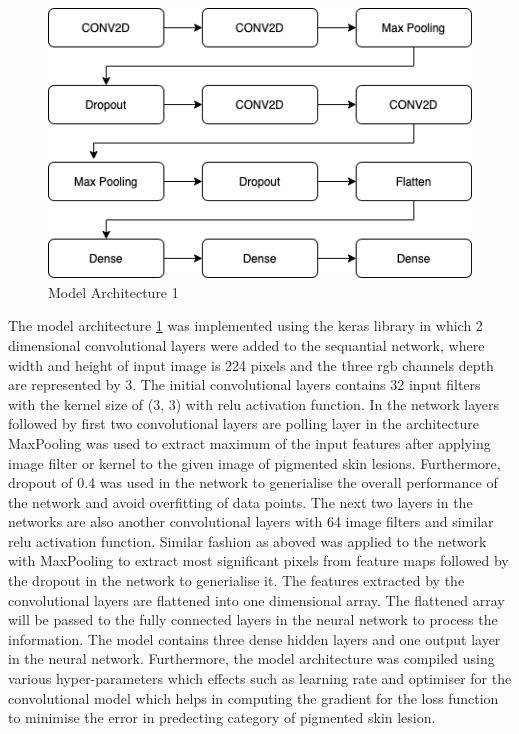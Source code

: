 \begin{figure}[!htp]
    \centering
    \includegraphics[width=\textwidth]{Images/model.png}
    \caption{Model Architecture 1}
    \label{fig:model1}
\end{figure}

The model architecture \ref{fig:model1} was implemented using the keras library in which 2 dimensional 
convolutional layers were added to the sequantial network, where width and height of input image is 224 pixels and the three rgb channels depth 
are represented by 3. The initial convolutional layers contains 32 input filters with the kernel size of (3, 3) with relu 
activation function. In the network layers followed by first two convolutional layers are polling layer in the 
architecture MaxPooling was used to extract maximum of the input features after applying image filter or kernel 
to the given image of pigmented skin lesions. Furthermore, dropout of 0.4 was used in the network to generialise the 
overall performance of the network and avoid overfitting of data points. 
The next two layers in the networks are also another convolutional layers with 64 image filters and similar relu activation function. Similar fashion as aboved was 
applied to the network with MaxPooling to extract most significant pixels from feature maps followed by the dropout in the network to generialise it.
The features extracted by the convolutional layers are flattened into one dimensional array. The flattened array will be passed to the fully connected layers in the neural network
to process the information. The model contains three dense hidden layers and one output layer in the neural network.
Furthermore, the model architecture was compiled using various hyper-parameters which effects such as learning rate and 
optimiser for the convolutional model which helps in computing the gradient for the loss function to minimise the error in predecting 
category of pigmented skin lesion.



